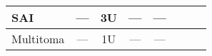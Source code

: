 \begin{table}[h]
{\begin{tabular}{|l|c|c|c|clcc}
SAI                                & ---                                    & 3U                                   & ---                                      & \multicolumn{1}{c|}{---}               & \multicolumn{1}{l|}{}                                                                                                        & \multicolumn{1}{l|}{}                       & \multicolumn{1}{l|}{}                   \\ \hline
Multitoma                          & ---                                    & 1U                                   & ---                                      & \multicolumn{1}{c|}{---}               & \multicolumn{1}{l|}{}                                                                                                        & \multicolumn{1}{l|}{}                       & \multicolumn{1}{l|}{}                   \\ \hline
\end{tabular}%
}
\end{table}

